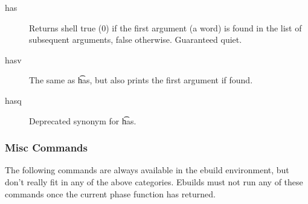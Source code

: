 \begin{description}
\item[has] Returns shell true (0) if the first argument (a word) is found in the list of subsequent
    arguments, false otherwise. Guaranteed quiet.
\item[hasv] The same as \t{has}, but also prints the first argument if found.
\item[hasq] Deprecated synonym for \t{has}.
\end{description}

\subsubsection{Misc Commands}
The following commands are always available in the ebuild environment, but don't really fit in any
of the above categories. Ebuilds must not run any of these commands once the current phase function
has returned.

